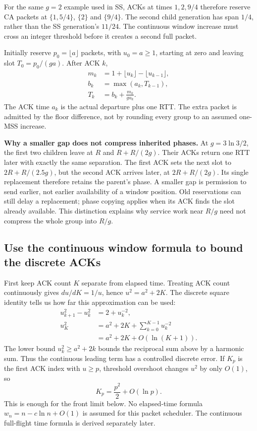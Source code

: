 \documentclass[sigconf,nonacm]{acmart}
\begin{document}
For the same $g=2$ example used in SS, ACKs at times $1,2,9/4$ therefore
reserve CA packets at $\{1,5/4\}$, $\{2\}$ and $\{9/4\}$. The second
child generation has span $1/4$, rather than the SS generation's $11/24$.
The continuous window increase must cross an integer threshold before it
creates a second full packet.

Initially reserve $p_0=\lfloor a\rfloor$ packets, with $u_0=a\ge1$,
starting at zero and leaving slot $T_0=p_0/(ga)$. After ACK $k$,
\begin{equation}\begin{aligned}
 m_k&=1+\lfloor u_k\rfloor-\lfloor u_{k-1}\rfloor,\\
 b_k&=\max(a_k,T_{k-1}),\\
 T_k&=b_k+\frac{m_k}{g u_k}.
\end{aligned}\label{eq:careserve}\end{equation}
The ACK time $a_k$ is the actual departure plus one RTT. The extra packet
is admitted by the floor difference, not by rounding every group to an
assumed one-MSS increase.

\textbf{Why a smaller gap does not compress inherited phases.}
At $g=3\ln3/2$, the first two children leave at $R$ and
$R+R/(2g)$. Their ACKs return one RTT later with exactly the same
separation. The first ACK sets the next slot to $2R+R/(2.5g)$,
but the second ACK arrives later, at $2R+R/(2g)$. Its single replacement
therefore retains the parent's phase. A smaller gap is permission to send
earlier, not earlier availability of a window position. Old reservations
can still delay a replacement; phase copying applies when its ACK finds
the slot already available. This distinction explains why service work
near $R/g$ need not compress the whole group into $R/g$.

\subsection{Use the continuous window formula to bound the discrete ACKs}
First keep ACK count $K$ separate from elapsed time. Treating ACK count
continuously gives $du/dK=1/u$, hence $u^2=a^2+2K$. The discrete square
identity tells us how far this approximation can be used:
\begin{equation}\begin{aligned}
 u_{k+1}^2-u_k^2&=2+u_k^{-2},\\
 u_K^2&=a^2+2K+\sum_{k=0}^{K-1}u_k^{-2}\\
       &=a^2+2K+O(\ln(K+1)).
\end{aligned}\label{eq:caack}\end{equation}
The lower bound $u_k^2\ge a^2+2k$ bounds the reciprocal sum above by a
harmonic sum. Thus the continuous leading term has a controlled discrete
error. If $K_p$ is the first ACK index with $u\ge p$, threshold overshoot
changes $u^2$ by only $O(1)$, so
\begin{equation}
 K_p=\frac{p^2}{2}+O(\ln p).
 \label{eq:cathresholdindex}
\end{equation}
This is enough for the front limit below. No elapsed-time formula
$w_n=n-c\ln n+O(1)$ is assumed for this packet scheduler. The continuous
full-flight time formula is derived separately later.
\end{document}
